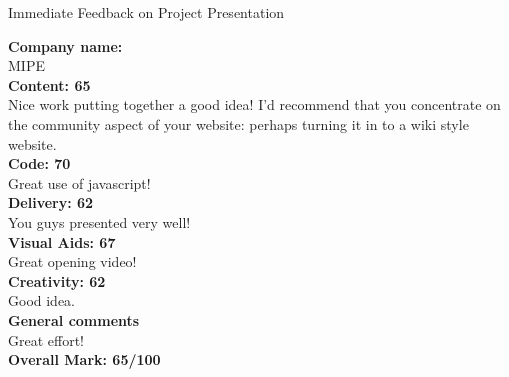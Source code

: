 \documentclass{article}
\begin{document}
\begin{center}
\Huge{Immediate Feedback on Project Presentation}\\
\end{center}


\normalsize
\textbf{Company name:}\\

MIPE \\

\textbf{Content: 65}\\

Nice work putting together a good idea!
I'd recommend that you concentrate on the community aspect of your website: perhaps turning it in to a wiki style website.\\

\textbf{Code: 70}\\

Great use of javascript!\\

\textbf{Delivery: 62}\\

You guys presented very well!\\

\textbf{Visual Aids: 67}\\

Great opening video!\\

\textbf{Creativity: 62}\\

Good idea.\\

\textbf{General comments}\\

Great effort!\\

\textbf{Overall Mark: 65/100}
\end{document}
